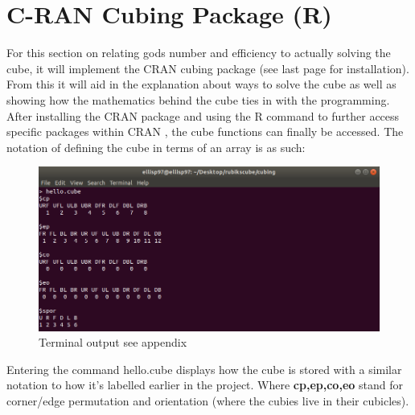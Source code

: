 \documentclass{article}
\newcounter{lem}[section]\setcounter{lem}{0}
\begin{document}
\newpage
\section{C-RAN Cubing Package (R)}

For this section on relating gods number and efficiency to actually solving the cube, it will implement the CRAN cubing package (see last page for installation). From this it will
aid in the explanation about ways to solve the cube as well as showing how the mathematics behind the cube ties in with the programming.
After installing the CRAN package and using the R command to further access specific packages within CRAN , the cube functions can finally be accessed. The notation of defining the cube in terms of an array is as such:

\begin{figure}[h]
	\centering
	\includegraphics[scale=.5]{terminalcube.png}
	\caption{Terminal output see appendix}
\end{figure}
Entering the command hello.cube displays how the cube is stored with a similar notation to how it's labelled earlier in the project. Where \textbf{cp,ep,co,eo} stand for corner/edge permutation and orientation (where the cubies live in their cubicles).
\end{document}
